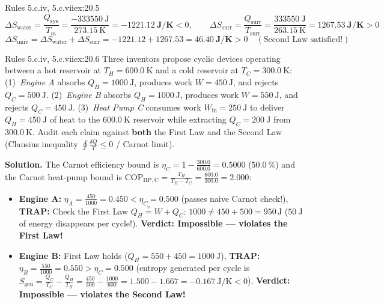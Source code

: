 \begin{workedexample}{Rules 5.c.iv, 5.c.vii}{ex:20.5}
$$\Delta S_{\mathrm{water}} = \frac{Q_{\mathrm{sys}}}{T_m} = \frac{\SI{-333550}{\joule}}{\SI{273.15}{\kelvin}} = \mathbf{\SI{-1221.12}{\joule\per\kelvin}} < 0, \qquad \Delta S_{\mathrm{surr}} = \frac{Q_{\mathrm{surr}}}{T_{\mathrm{surr}}} = \frac{\SI{+333550}{\joule}}{\SI{263.15}{\kelvin}} = \mathbf{\SI{+1267.53}{\joule\per\kelvin}} > 0$$
$$\Delta S_{\mathrm{univ}} = \Delta S_{\mathrm{water}} + \Delta S_{\mathrm{surr}} = -1221.12 + 1267.53 = \mathbf{\SI{+46.40}{\joule\per\kelvin}} > 0 \quad (\text{Second Law satisfied!})$$
\end{workedexample}

\begin{workedexample}{Rules 5.c.iv, 5.c.vii}{ex:20.6}
Three inventors propose cyclic devices operating between a hot reservoir at $T_H = \SI{600.0}{\kelvin}$ and a cold reservoir at $T_C = \SI{300.0}{\kelvin}$:
(1)~\emph{Engine A} absorbs $Q_H = \SI{1000}{\joule}$, produces work $W = \SI{450}{\joule}$, and rejects $Q_C = \SI{500}{\joule}$.
(2)~\emph{Engine B} absorbs $Q_H = \SI{1000}{\joule}$, produces work $W = \SI{550}{\joule}$, and rejects $Q_C = \SI{450}{\joule}$.
(3)~\emph{Heat Pump C} consumes work $W_{\mathrm{in}} = \SI{250}{\joule}$ to deliver $Q_H = \SI{450}{\joule}$ of heat to the $\SI{600.0}{\kelvin}$ reservoir while extracting $Q_C = \SI{200}{\joule}$ from $\SI{300.0}{\kelvin}$.
Audit each claim against \textbf{both} the First Law and the Second Law (Clausius inequality $\oint \frac{\delta Q}{T} \le 0$ / Carnot limit).
\par\smallskip\noindent
\textbf{Solution.}
The Carnot efficiency bound is $\eta_C = 1 - \frac{300.0}{600.0} = \mathbf{0.5000}$ ($\SI{50.0}{\percent}$) and the Carnot heat-pump bound is $\mathrm{COP}_{\mathrm{HP,C}} = \frac{T_H}{T_H - T_C} = \frac{600.0}{300.0} = \mathbf{2.000}$:
\begin{itemize}
  \item \textbf{Engine A:} $\eta_A = \frac{450}{1000} = 0.450 < \eta_C = 0.500$ (passes naive Carnot check!), \textbf{TRAP:} Check the First Law $Q_H \stackrel{?}{=} W + Q_C$: $1000 \ne 450 + 500 = 950\,\si{\joule}$ ($\SI{50}{\joule}$ of energy disappears per cycle!). \textbf{Verdict: Impossible --- violates the First Law!}
  \item \textbf{Engine B:} First Law holds ($Q_H = 550 + 450 = \SI{1000}{\joule}$), \textbf{TRAP:} $\eta_B = \frac{550}{1000} = \mathbf{0.550} > \eta_C = 0.500$ (entropy generated per cycle is $S_{\mathrm{gen}} = \frac{Q_C}{T_C} - \frac{Q_H}{T_H} = \frac{450}{300} - \frac{1000}{600} = 1.500 - 1.667 = \SI{-0.167}{\joule\per\kelvin} < 0$). \textbf{Verdict: Impossible --- violates the Second Law!}

\end{itemize}
\end{workedexample}
